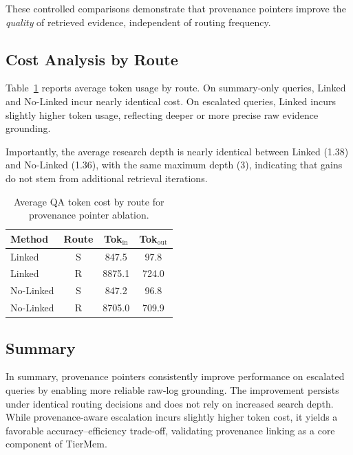 \documentclass{article}
\theoremstyle{plain}
\theoremstyle{definition}
\theoremstyle{remark}
\begin{document}
These controlled comparisons demonstrate that provenance pointers improve the \emph{quality} of retrieved evidence, independent of routing frequency.

\subsection{Cost Analysis by Route}
\label{app:provenance_cost}
Table~\ref{tab:provenance_cost} reports average token usage by route.
On summary-only queries, Linked and No-Linked incur nearly identical cost.
On escalated queries, Linked incurs slightly higher token usage, reflecting deeper or more precise raw evidence grounding.

Importantly, the average research depth is nearly identical between Linked (1.38) and No-Linked (1.36), with the same maximum depth (3), indicating that gains do not stem from additional retrieval iterations.

\begin{table}[H]
\centering
\small
\setlength{\tabcolsep}{6pt}
\begin{tabular}{lccc}
\toprule
\textbf{Method} & \textbf{Route} & \textbf{Tok$_{\text{in}}$} & \textbf{Tok$_{\text{out}}$} \\
\midrule
Linked & S & 847.5 & 97.8 \\
Linked & R & 8875.1 & 724.0 \\
\midrule
No-Linked & S & 847.2 & 96.8 \\
No-Linked & R & 8705.0 & 709.9 \\
\bottomrule
\end{tabular}
\caption{Average QA token cost by route for provenance pointer ablation.}
\label{tab:provenance_cost}
\end{table}

\subsection{Summary}
\label{app:provenance_summary}
In summary, provenance pointers consistently improve performance on escalated queries by enabling more reliable raw-log grounding.
The improvement persists under identical routing decisions and does not rely on increased search depth.
While provenance-aware escalation incurs slightly higher token cost, it yields a favorable accuracy--efficiency trade-off, validating provenance linking as a core component of TierMem.

\end{document}
